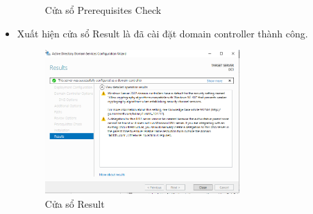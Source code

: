 \documentclass[13pt]{report}
\begin{document}
\begin{itemize}
\begin{figure}[htp]
			\caption{Cửa sổ Prerequisites Check}
		\end{figure}
		\newpage
		\item Xuất hiện cửa sổ Result là đã cài đặt domain controller thành công.
		\begin{figure}[htp]
			\centering
			\includegraphics[width=0.7\textwidth]{image/Gui/ADDC/18.png}
			\caption{Cửa sổ Result}
		\end{figure}
	\end{itemize}
\end{document}
